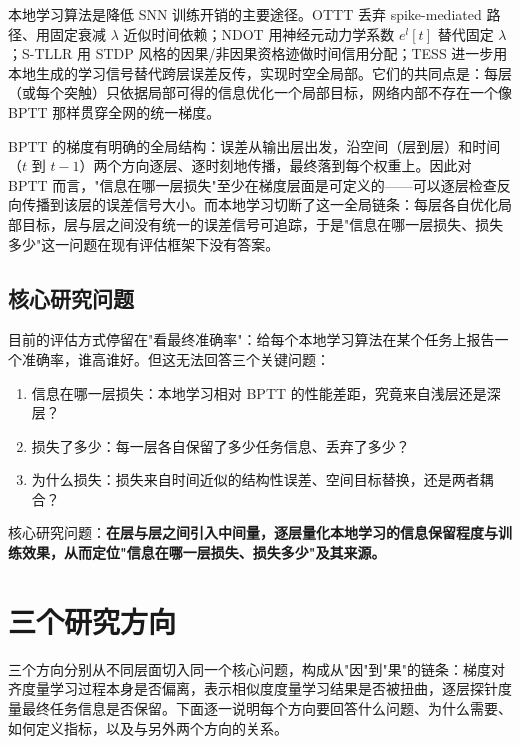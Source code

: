 \documentclass[journal,12pt,onecolumn]{IEEEtran}
\begin{document}
本地学习算法是降低 SNN 训练开销的主要途径。OTTT \cite{xiao_online_2022} 丢弃 spike-mediated 路径、用固定衰减 $\lambda$ 近似时间依赖；NDOT \cite{jiang_ndot_nodate} 用神经元动力学系数 $e^l[t]$ 替代固定 $\lambda$；S-TLLR \cite{apolinario_s-tllr_2024} 用 STDP 风格的因果/非因果资格迹做时间信用分配；TESS \cite{apolinario_tess_2025} 进一步用本地生成的学习信号替代跨层误差反传，实现时空全局部。它们的共同点是：每层（或每个突触）只依据局部可得的信息优化一个局部目标，网络内部不存在一个像 BPTT 那样贯穿全网的统一梯度。

BPTT 的梯度有明确的全局结构：误差从输出层出发，沿空间（层到层）和时间（$t$ 到 $t-1$）两个方向逐层、逐时刻地传播，最终落到每个权重上。因此对 BPTT 而言，"信息在哪一层损失"至少在梯度层面是可定义的——可以逐层检查反向传播到该层的误差信号大小。而本地学习切断了这一全局链条：每层各自优化局部目标，层与层之间没有统一的误差信号可追踪，于是"信息在哪一层损失、损失多少"这一问题在现有评估框架下没有答案。

\subsection{核心研究问题}

目前的评估方式停留在"看最终准确率"：给每个本地学习算法在某个任务上报告一个准确率，谁高谁好。但这无法回答三个关键问题：

\begin{enumerate}[leftmargin=1.5em,itemsep=0pt]
\item 信息在哪一层损失：本地学习相对 BPTT 的性能差距，究竟来自浅层还是深层？
\item 损失了多少：每一层各自保留了多少任务信息、丢弃了多少？
\item 为什么损失：损失来自时间近似的结构性误差、空间目标替换，还是两者耦合？
\end{enumerate}

核心研究问题：\textbf{在层与层之间引入中间量，逐层量化本地学习的信息保留程度与训练效果，从而定位"信息在哪一层损失、损失多少"及其来源。}





\section{三个研究方向}

三个方向分别从不同层面切入同一个核心问题，构成从"因"到"果"的链条：梯度对齐度量学习过程本身是否偏离，表示相似度度量学习结果是否被扭曲，逐层探针度量最终任务信息是否保留。下面逐一说明每个方向要回答什么问题、为什么需要、如何定义指标，以及与另外两个方向的关系。
\end{document}
